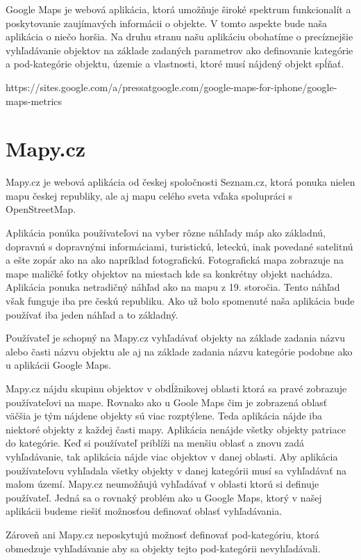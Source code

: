 Google Maps je webová aplikácia, ktorá umožňuje široké spektrum funkcionalít a poskytovanie zaujímavých informácii o objekte. V tomto aspekte bude naša aplikácia o niečo horšia. 
Na druhu stranu našu aplikáciu obohatíme o precíznejšie vyhľadávanie objektov na základe 
zadaných parametrov ako definovanie kategórie a pod-kategórie objektu, územie a vlastnosti, ktoré musí nájdený objekt spĺňať. 


https://sites.google.com/a/pressatgoogle.com/google-maps-for-iphone/google-maps-metrics


\section{Mapy.cz}
Mapy.cz je webová aplikácia od českej spoločnosti Seznam.cz, ktorá ponuka nielen mapu českej republiky,
ale aj mapu celého sveta vďaka spolupráci s OpenStreetMap. 

Aplikácia ponúka používateľovi na vyber rôzne náhľady máp ako základnú, dopravnú s dopravnými informáciami,
turistickú, leteckú, inak povedané satelitnú a ešte zopár  ako na ako napríklad fotografickú.
Fotografická mapa zobrazuje na mape maličké fotky objektov na miestach kde sa konkrétny objekt nachádza. 
Aplikácia ponuka netradičný náhľad ako na mapu z 19. storočia. Tento náhľad však funguje iba pre českú republiku.
Ako už bolo spomenuté naša aplikácia bude používať iba jeden náhľad a to základný. 

Používateľ je schopný na Mapy.cz vyhľadávať objekty na základe zadania názvu alebo časti názvu objektu ale aj 
na základe zadania názvu kategórie podobne ako u aplikácii Google Maps. 


Mapy.cz nájdu skupinu objektov v obdĺžnikovej oblasti ktorá sa pravé zobrazuje používateľovi na mape. 
Rovnako ako u Goole Maps čim je zobrazená oblasť väčšia je tým nájdene objekty sú viac rozptýlene. Teda aplikácia nájde iba niektoré 
objekty z každej časti mapy. Aplikácia nenájde všetky objekty patriace do kategórie. Keď si používateľ priblíži 
na menšiu oblasť a znovu zadá vyhľadávanie, tak aplikácia nájde viac objektov v danej oblasti. 
Aby aplikácia používateľovu vyhľadala všetky objekty v danej kategórii musí sa vyhľadávať na malom území.  
Mapy.cz neumožňujú vyhľadávať v oblasti ktorú si definuje používateľ. Jedná sa o rovnaký problém ako u Google Maps,
ktorý v našej aplikácii budeme riešiť možnosťou definovať oblasť vyhľadávania. 

Zároveň ani Mapy.cz neposkytujú možnosť definovať pod-kategóriu, ktorá obmedzuje vyhľadávanie aby sa objekty tejto pod-kategórii nevyhľadávali. 

